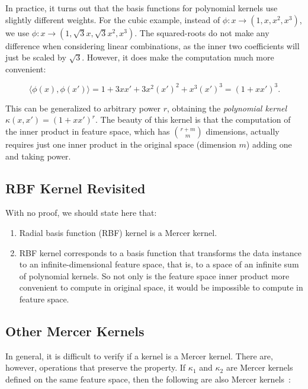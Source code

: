 \begin{refsection}
In practice, it turns out that the basis functions for polynomial kernels use slightly different weights. For the cubic example, instead of $\phi: x \rightarrow (1, x, x^2, x^3)$, we use $\phi: x \rightarrow (1, \sqrt{3}x, \sqrt{3}x^2, x^3)$. The squared-roots do not make any difference when considering linear combinations, as the inner two coefficients will just be scaled by $\sqrt{3}$. However, it does make the computation much more convenient:

$$\langle\phi(x), \phi(x')\rangle = 1 + 3xx' + 3x^2(x')^2 + x^3(x')^3 = (1 + xx')^3.$$

This can be generalized to arbitrary power $r$, obtaining the {\em polynomial kernel} $\kappa(x,x') = (1 + xx')^r$. The beauty of this kernel is that the computation of the inner product in feature space, which has ${r+m}\choose{m}$ dimensions, actually requires just one inner product in the original space (dimension $m$) adding one and taking power.

\subsection*{RBF Kernel Revisited}

With no proof, we should state here that:
\begin{enumerate}
\item Radial basis function (RBF) kernel is a Mercer kernel.
\item RBF kernel corresponds to a basis function that transforms the data instance to an infinite-dimensional feature space, that is, to a space of an infinite sum of polynomial kernels. So not only is the feature space inner product more convenient to compute in original space, it would be impossible to compute in feature space.
\end{enumerate}



\subsection*{Other Mercer Kernels}

In general, it is difficult to verify if a kernel is a Mercer kernel. There are, however, operations that preserve the property. If $\kappa_1$ and $\kappa_2$ are Mercer kernels defined on the same feature space, then the following are also Mercer kernels~\citep{ShaweTaylorCristianini2004}:


\end{refsection}
